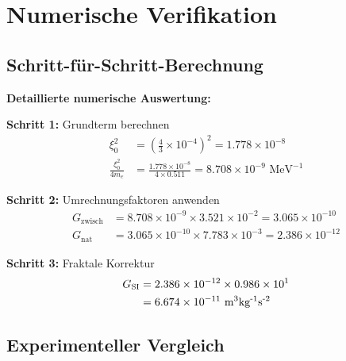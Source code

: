 \documentclass[12pt,a4paper]{article}
\begin{document}
	\section{Numerische Verifikation}
	
	\subsection{Schritt-für-Schritt-Berechnung}
	
	\begin{verification}
		\textbf{Detaillierte numerische Auswertung:}
		
		\textbf{Schritt 1:} Grundterm berechnen
		\begin{align}
			\xi_0^2 &= \left(\frac{4}{3} \times 10^{-4}\right)^2 = 1.778 \times 10^{-8} \\
			\frac{\xi_0^2}{4 m_e} &= \frac{1.778 \times 10^{-8}}{4 \times 0.511} = 8.708 \times 10^{-9} \text{ MeV}^{-1}
		\end{align}
		
		\textbf{Schritt 2:} Umrechnungsfaktoren anwenden
		\begin{align}
			G_{\text{zwisch}} &= 8.708 \times 10^{-9} \times 3.521 \times 10^{-2} = 3.065 \times 10^{-10} \\
			G_{\text{nat}} &= 3.065 \times 10^{-10} \times 7.783 \times 10^{-3} = 2.386 \times 10^{-12}
		\end{align}
		
		\textbf{Schritt 3:} Fraktale Korrektur
		\begin{align}
			G_{\text{SI}} &= 2.386 \times 10^{-12} \times 0.986 \times 10^{1} \\
			&= 6.674 \times 10^{-11} \text{ m\textsuperscript{3}kg\textsuperscript{-1}s\textsuperscript{-2}}
		\end{align}
	\end{verification}
	
	\subsection{Experimenteller Vergleich}
	
\end{document}
